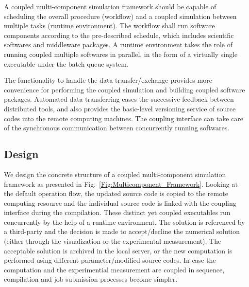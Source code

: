 \documentclass[10pt,conference]{IEEEtran}
\begin{document}
A coupled multi-component simulation framework should be capable of
scheduling the overall procedure (workflow) and
a coupled simulation between multiple tasks (runtime environment).
The workflow shall run software components according to 
the pre-described schedule, which includes scientific softwares 
and middleware packages. A runtime environment takes the role of
running coupled multiple softwares in parallel, 
in the form of a virtually single executable 
under the batch queue system.

The functionality to handle the data transfer/exchange provides
more convenience for performing the coupled simulation and 
building coupled software packages. Automated data transferring
eases the successive feedback between distributed tools,
and also provides the basic-level versioning service 
of source codes into the remote computing machines.
The coupling interface can take care of the synchronous communication
between concurrently running softwares.


\subsection{Design}
We design the concrete structure of a coupled multi-component 
simulation framework as presented in Fig.~\ref{Fig:Multicomponent_Framework}.
Looking at the default operation flow, the updated source code is copied to
the remote computing resource and the individual source code is linked with
the coupling interface during the compilation. These distinct yet coupled
executables run concurrently by the help of a runtime environment. The solution
is referenced by a third-party and the decision is made to accept/decline
the numerical solution (either through the visualization or 
the experimental measurement). The acceptable solution is archived 
in the local server, or the new computation is performed using different
parameter/modified source codes. In case the computation and 
the experimential measurement are coupled in sequence, 
compilation and job submission processes become simpler.
\end{document}
